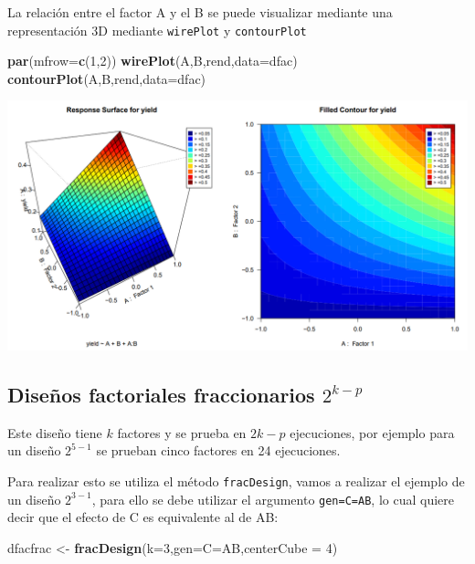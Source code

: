 \documentclass[
]{book}
\newenvironment{Shaded}{\begin{snugshade}}{\end{snugshade}}
\newcommand{\AttributeTok}[1]{\textcolor[rgb]{0.13,0.29,0.53}{#1}}
\newcommand{\DecValTok}[1]{\textcolor[rgb]{0.00,0.00,0.81}{#1}}
\newcommand{\FunctionTok}[1]{\textcolor[rgb]{0.13,0.29,0.53}{\textbf{#1}}}
\newcommand{\NormalTok}[1]{#1}
\newcommand{\OtherTok}[1]{\textcolor[rgb]{0.56,0.35,0.01}{#1}}
\newcommand{\StringTok}[1]{\textcolor[rgb]{0.31,0.60,0.02}{#1}}
\begin{document}
La relación entre el factor A y el B se puede visualizar mediante una representación 3D mediante \texttt{wirePlot} y \texttt{contourPlot}

\begin{Shaded}
\begin{Highlighting}[]
\FunctionTok{par}\NormalTok{(}\AttributeTok{mfrow=}\FunctionTok{c}\NormalTok{(}\DecValTok{1}\NormalTok{,}\DecValTok{2}\NormalTok{))}
\FunctionTok{wirePlot}\NormalTok{(A,B,rend,}\AttributeTok{data=}\NormalTok{dfac)}
\FunctionTok{contourPlot}\NormalTok{(A,B,rend,}\AttributeTok{data=}\NormalTok{dfac)}
\end{Highlighting}
\end{Shaded}

\includegraphics[width=7.29167in,height=\textheight]{graficos/dfac3d.png}

\hypertarget{diseuxf1os-factoriales-fraccionarios-2k-p}{%
\subsection{\texorpdfstring{Diseños factoriales fraccionarios \(2^{k-p}\)}{Diseños factoriales fraccionarios 2\^{}\{k-p\}}}\label{diseuxf1os-factoriales-fraccionarios-2k-p}}

Este diseño tiene \(k\) factores y se prueba en \(2k-p\) ejecuciones, por ejemplo para un diseño \(2^{5-1}\) se prueban cinco factores en 24 ejecuciones.

Para realizar esto se utiliza el método \texttt{fracDesign}, vamos a realizar el ejemplo de un diseño \(2^{3-1}\), para ello se debe utilizar el argumento \texttt{gen=\textquotesingle{}C=AB\textquotesingle{}}, lo cual quiere decir que el efecto de C es equivalente al de AB:

\begin{Shaded}
\begin{Highlighting}[]
\NormalTok{dfacfrac }\OtherTok{\textless{}{-}} \FunctionTok{fracDesign}\NormalTok{(}\AttributeTok{k=}\DecValTok{3}\NormalTok{,}\AttributeTok{gen=}\StringTok{\textquotesingle{}C=AB\textquotesingle{}}\NormalTok{,}\AttributeTok{centerCube =} \DecValTok{4}\NormalTok{)}
\end{Highlighting}
\end{Shaded}
\end{document}
